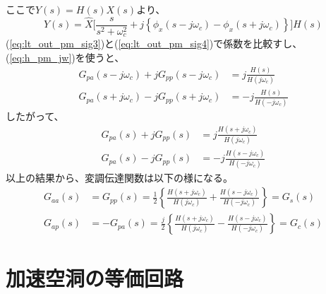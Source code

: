 \documentclass[book]{jlreq}
\begin{document}
%
ここで$Y(s) = H(s) X(s)$より、
%
\begin{equation}
    Y(s) = \hat{X} \biggl [\frac{s}{s^2+\omega_c^2}
    + j \left \{\phi_x(s - j\omega_c) - \phi_x(s+j\omega_c)\right \}  \biggr ] H(s)
    \label{eq:lt_out_pm_sig4}
\end{equation}
%
(\ref{eq:lt_out_pm_sig3})と(\ref{eq:lt_out_pm_sig4})で係数を比較すし、(\ref{eq:h_pm_jw})を使うと、
%
\begin{equation}
    \begin{split}
        G_{pa}(s-j\omega_c) + j G_{pp}(s-j\omega_c) &= j \frac{H(s)}{H(j\omega_c)} \\
        G_{pa}(s+j\omega_c) - j G_{pp}(s+j\omega_c) &= -j \frac{H(s)}{H(-j\omega_c)} 
    \end{split}
\end{equation}
%
したがって、
%
\begin{equation}
    \begin{split}
         G_{pa}(s) + j G_{pp}(s) &= j \frac{H(s+j\omega_c)}{H(j\omega_c)} \\
        G_{pa}(s) - j G_{pp}(s) &= -j \frac{H(s-j\omega_c)}{H(-j\omega_c)} 
    \end{split}
\end{equation}
%
以上の結果から、変調伝達関数は以下の様になる。
%
\begin{equation}
    \begin{split}
        G_{aa}(s) &= G_{pp}(s) 
        = \frac{1}{2}\left\{\frac{H(s+j\omega_c)}{H(j\omega_c)} + \frac{H(s-j\omega_c)}{H(-j\omega_c)}\right\} = G_s(s)\\
        G_{ap}(s) &= -G_{pa}(s) 
        = \frac{j}{2}\left\{\frac{H(s+j\omega_c)}{H(j\omega_c)} - \frac{H(s-j\omega_c)}{H(-j\omega_c)}\right\} = G_c(s)
    \end{split}
\end{equation}
%

\appendix
\chapter{加速空洞の等価回路}
\end{document}
